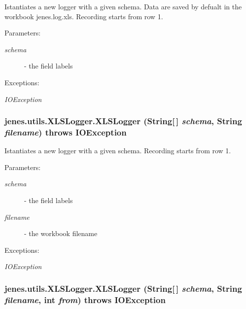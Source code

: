 Istantiates a new logger with a given schema. Data are saved by defualt in the workbook jenes.log.xls. Recording starts from row 1.

\begin{Desc}
\item[Parameters:]
\begin{description}
\item[{\em schema}]- the field labels \end{description}
\end{Desc}
\begin{Desc}
\item[Exceptions:]
\begin{description}
\item[{\em IOException}]\end{description}
\end{Desc}
\hypertarget{classjenes_1_1utils_1_1_x_l_s_logger_256b5ddf3beaa1eedb2290b52bb1a845}{
\subsubsection[XLSLogger]{\setlength{\rightskip}{0pt plus 5cm}jenes.utils.XLSLogger.XLSLogger (String\mbox{[}$\,$\mbox{]} {\em schema}, \/  String {\em filename})  throws IOException }}
\label{classjenes_1_1utils_1_1_x_l_s_logger_256b5ddf3beaa1eedb2290b52bb1a845}


Istantiates a new logger with a given schema. Recording starts from row 1.

\begin{Desc}
\item[Parameters:]
\begin{description}
\item[{\em schema}]- the field labels \item[{\em filename}]- the workbook filename \end{description}
\end{Desc}
\begin{Desc}
\item[Exceptions:]
\begin{description}
\item[{\em IOException}]\end{description}
\end{Desc}
\hypertarget{classjenes_1_1utils_1_1_x_l_s_logger_c43b3385840e86a2ad4acd5040e8326b}{
\subsubsection[XLSLogger]{\setlength{\rightskip}{0pt plus 5cm}jenes.utils.XLSLogger.XLSLogger (String\mbox{[}$\,$\mbox{]} {\em schema}, \/  String {\em filename}, \/  int {\em from})  throws IOException }}
\label{classjenes_1_1utils_1_1_x_l_s_logger_c43b3385840e86a2ad4acd5040e8326b}


